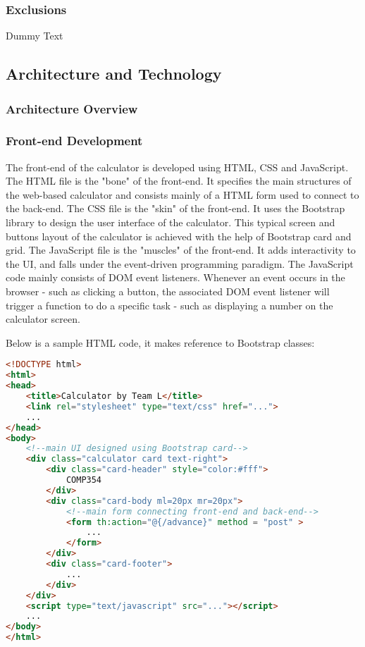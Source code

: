 \documentclass[12pt]{article}
\begin{document}
    \subsubsection{Exclusions}
    Dummy Text

\subsection{Architecture and Technology}
\subsubsection{Architecture Overview}
\subsubsection{Front-end Development}
    The front-end of the calculator is developed using HTML, CSS and JavaScript. The HTML file is the "bone" of the front-end. It specifies the main structures of the web-based calculator and consists mainly of a HTML form used to connect to the back-end. The CSS file is the "skin" of the front-end. It uses the Bootstrap library to design the user interface of the calculator. This typical screen and buttons layout of the calculator is achieved with the help of Bootstrap card and grid. The JavaScript file is the "muscles" of the front-end. It adds interactivity to the UI, and falls under the event-driven programming paradigm. The JavaScript code mainly consists of DOM event listeners. Whenever an event occurs in the browser - such as clicking a button, the associated DOM event listener will trigger a function to do a specific task - such as displaying a number on the calculator screen.\newline 
    
    \noindent Below is a sample HTML code, it makes reference to Bootstrap classes: 
    
    \begin{lstlisting}[language=HTML]
<!DOCTYPE html>
<html>
<head>
	<title>Calculator by Team L</title>
	<link rel="stylesheet" type="text/css" href="...">
	...
</head>
<body>
    <!--main UI designed using Bootstrap card-->
    <div class="calculator card text-right">
        <div class="card-header" style="color:#fff">
            COMP354
        </div>
        <div class="card-body ml=20px mr=20px">
            <!--main form connecting front-end and back-end-->
            <form th:action="@{/advance}" method = "post" >
            	...
            </form>
        </div>
        <div class="card-footer">
            ...
        </div>
    </div>
    <script type="text/javascript" src="..."></script>
    ...
</body>
</html>
    \end{lstlisting}
    
\end{document}
